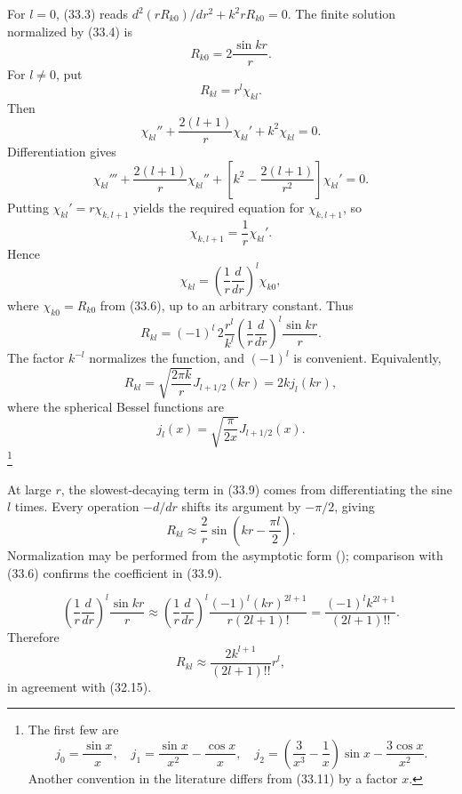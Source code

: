 For $l=0$, (33.3) reads
$d^2(rR_{k0})/dr^2+k^2rR_{k0}=0$. The finite solution normalized by (33.4)
is
\begin{equation}R_{k0}=2\frac{\sin kr}{r}.\tag{33.6}\end{equation}
For $l\ne0$, put
\begin{equation}R_{kl}=r^l\chi_{kl}.\tag{33.7}\end{equation}
Then
\[\chi_{kl}''+\frac{2(l+1)}r\chi_{kl}'+k^2\chi_{kl}=0.\]
Differentiation gives
\[\chi_{kl}'''+\frac{2(l+1)}r\chi_{kl}''+\left[k^2-\frac{2(l+1)}{r^2}\right]\chi_{kl}'=0.\]
Putting $\chi_{kl}'=r\chi_{k,l+1}$ yields the required equation for
$\chi_{k,l+1}$, so
\begin{equation}\chi_{k,l+1}=\frac1r\chi_{kl}'.\tag{33.8}\end{equation}
Hence
\[\chi_{kl}=\left(\frac1r\frac d{dr}\right)^l\chi_{k0},\]
where $\chi_{k0}=R_{k0}$ from (33.6), up to an arbitrary constant. Thus
\begin{equation}
 R_{kl}=(-1)^l\,2\frac{r^l}{k^l}\left(\frac1r\frac d{dr}\right)^l\frac{\sin kr}{r}.
 \tag{33.9}
\end{equation}
The factor $k^{-l}$ normalizes the function, and $(-1)^l$ is convenient.
Equivalently,
\begin{equation}
 R_{kl}=\sqrt{\frac{2\pi k}{r}}J_{l+1/2}(kr)=2k j_l(kr),\tag{33.10}
\end{equation}
where the spherical Bessel functions are
\begin{equation}j_l(x)=\sqrt{\frac\pi{2x}}J_{l+1/2}(x).\tag{33.11}\end{equation}
\footnote{The first few are
\[
j_0=\frac{\sin x}x,\quad j_1=\frac{\sin x}{x^2}-\frac{\cos x}x,\quad
j_2=\left(\frac3{x^3}-\frac1x\right)\sin x-\frac{3\cos x}{x^2}.
\]
Another convention in the literature differs from (33.11) by a factor $x$.}

At large $r$, the slowest-decaying term in (33.9) comes from differentiating
the sine $l$ times. Every operation $-d/dr$ shifts its argument by $-\pi/2$,
giving
\begin{equation}R_{kl}\approx\frac2r\sin\left(kr-\frac{\pi l}2\right).\tag{33.12}\end{equation}
Normalization may be performed from the asymptotic form (); comparison
with (33.6) confirms the coefficient in (33.9).

\[
\left(\frac1r\frac d{dr}\right)^l\frac{\sin kr}r
\approx\left(\frac1r\frac d{dr}\right)^l\frac{(-1)^l(kr)^{2l+1}}{r(2l+1)!}
=\frac{(-1)^lk^{2l+1}}{(2l+1)!!}.
\]
Therefore
\begin{equation}R_{kl}\approx\frac{2k^{l+1}}{(2l+1)!!}r^l,\tag{33.13}\end{equation}
in agreement with (32.15).

